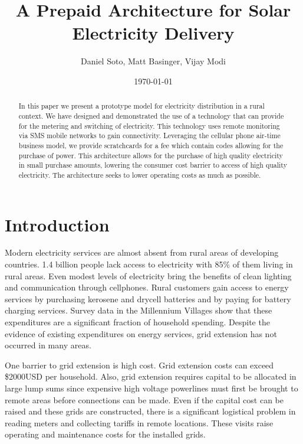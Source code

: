 \documentclass[conference]{IEEEtran}
\begin{document}
\title{A Prepaid Architecture for Solar Electricity Delivery}
\author{{Daniel Soto}, Matt Basinger, Vijay Modi}
\date{\today}
\maketitle

\begin{abstract}
In this paper we present a prototype model for electricity
distribution in a rural context.
We have designed and demonstrated the use of a technology that
can provide for the metering and switching of electricity.
This technology uses remote monitoring via SMS mobile networks
to gain connectivity.
Leveraging the cellular phone air-time business model, we provide
scratchcards for a fee which contain codes allowing for the purchase of
power.
This architecture allows for the purchase of high quality electricity in
small purchase amounts, lowering the consumer cost barrier to access of
high quality electricity.
The architecture seeks to lower operating costs as much as possible.
\end{abstract}

\section{Introduction}
Modern electricity services are almost absent from rural
areas of developing countries.
1.4 billion people lack access to electricity with 85\% of
them living in rural areas.\cite{WEO2010}
Even modest levels of electricity bring the benefits of clean lighting
and communication through cellphones.
Rural customers gain access to energy services by purchasing
kerosene and drycell batteries and by paying for battery charging 
services.
Survey data in the Millennium Villages show that these expenditures
are a significant fraction of household spending.\cite{MVPEnergy}
Despite the evidence of existing
expenditures on energy services,
grid extension has not occurred in many areas.

One barrier to grid extension is high cost.
Grid extension costs can exceed \$2000USD per household.\cite{ModiPlanningKenya}
Also, grid extension requires capital to be allocated in large
lump sums since expensive high voltage powerlines must first be brought to remote areas
before connections can be made.
Even if the capital cost can be raised and these grids are 
constructed, there is a significant
logistical problem in reading meters and collecting tariffs
in remote locations.
These visits raise operating and maintenance costs for the installed grids.
\end{document}
